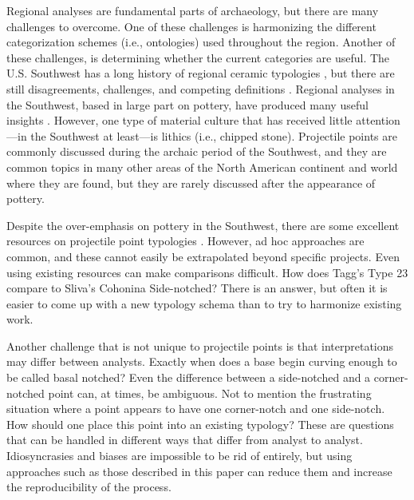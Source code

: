 \documentclass[letterpaper]{article}
\begin{document}
Regional analyses are fundamental parts of archaeology, but there are many challenges to overcome. One of these challenges is harmonizing the different categorization schemes (i.e., ontologies) used throughout the region. Another of these challenges, is determining whether the current categories are useful. The U.S. Southwest has a long history of regional ceramic typologies \autocites[e.g.,][]{Colton1956-zy,gladwin1930a,Hargrave1932-ng,Kidder1915-ae,Martin1940-jg}, but there are still disagreements, challenges, and competing definitions \autocite{Duff1996-au}. Regional analyses in the Southwest, based in large part on pottery, have produced many useful insights \autocites[e.g.,][]{Bernardini2005-ue,Clark2019-bz,Hegmon2016-xw,Mills2013-wq,Peeples2018-ib}. However, one type of material culture that has received little attention---in the Southwest at least---is lithics (i.e., chipped stone). Projectile points are commonly discussed during the archaic period of the Southwest, and they are common topics in many other areas of the North American continent and world where they are found, but they are rarely discussed after the appearance of pottery.

Despite the over-emphasis on pottery in the Southwest, there are some excellent resources on projectile point typologies \autocites[e.g.,][]{Hoffman1997-hb,Justice2002-cf,Loendorf2004-tp,Sliva2006-nq}. However, ad hoc approaches are common, and these cannot easily be extrapolated beyond specific projects. Even using existing resources can make comparisons difficult. How does Tagg's \autocite*[p.111]{Tagg1994-wi} Type 23 compare to Sliva's \autocite*[p.~35]{Sliva2006-nq} Cohonina Side-notched? There is an answer, but often it is easier to come up with a new typology schema than to try to harmonize existing work.

Another challenge that is not unique to projectile points is that interpretations may differ between analysts. Exactly when does a base begin curving enough to be called basal notched? Even the difference between a side-notched and a corner-notched point can, at times, be ambiguous. Not to mention the frustrating situation where a point appears to have one corner-notch and one side-notch. How should one place this point into an existing typology? These are questions that can be handled in different ways that differ from analyst to analyst. Idiosyncrasies and biases are impossible to be rid of entirely, but using approaches such as those described in this paper can reduce them and increase the reproducibility of the process.
\end{document}
